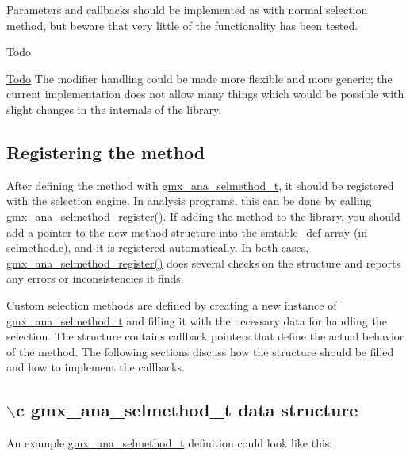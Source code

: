\-Parameters and callbacks should be implemented as with normal selection method, but beware that very little of the functionality has been tested.

\begin{DoxyRefDesc}{\-Todo}
\item[\hyperlink{todo__todo000001}{\-Todo}]\-The modifier handling could be made more flexible and more generic; the current implementation does not allow many things which would be possible with slight changes in the internals of the library.\end{DoxyRefDesc}
\hypertarget{selmethods_selmethods_register}{}\subsection{\-Registering the method}\label{selmethods_selmethods_register}
\-After defining the method with {\ttfamily \hyperlink{structgmx__ana__selmethod__t}{gmx\-\_\-ana\-\_\-selmethod\-\_\-t}}, it should be registered with the selection engine. \-In analysis programs, this can be done by calling \hyperlink{include_2selmethod_8h_a820231622b6b4dd57fba7570f705498f}{gmx\-\_\-ana\-\_\-selmethod\-\_\-register()}. \-If adding the method to the library, you should add a pointer to the new method structure into the {\ttfamily smtable\-\_\-def} array (in \hyperlink{selmethod_8c}{selmethod.c}), and it is registered automatically. \-In both cases, \hyperlink{include_2selmethod_8h_a820231622b6b4dd57fba7570f705498f}{gmx\-\_\-ana\-\_\-selmethod\-\_\-register()} does several checks on the structure and reports any errors or inconsistencies it finds.

\-Custom selection methods are defined by creating a new instance of {\ttfamily \hyperlink{structgmx__ana__selmethod__t}{gmx\-\_\-ana\-\_\-selmethod\-\_\-t}} and filling it with the necessary data for handling the selection. \-The structure contains callback pointers that define the actual behavior of the method. \-The following sections discuss how the structure should be filled and how to implement the callbacks.\hypertarget{selmethods_selmethods_define}{}\subsection{$\backslash$c gmx\-\_\-ana\-\_\-selmethod\-\_\-t data structure}\label{selmethods_selmethods_define}
\-An example {\ttfamily \hyperlink{structgmx__ana__selmethod__t}{gmx\-\_\-ana\-\_\-selmethod\-\_\-t}} definition could look like this\-:


